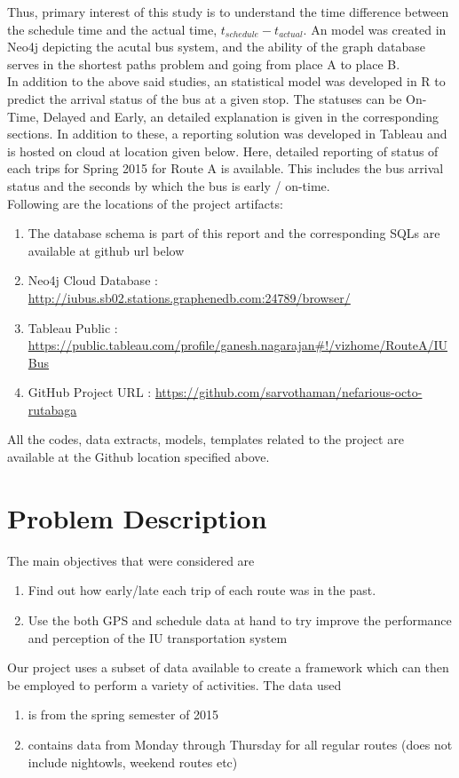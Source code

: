 \documentclass[12pt]{article}\usepackage[]{graphicx}\usepackage[]{color}
\begin{document}
Thus, primary interest of this study is to understand the time difference between the schedule time and the actual time, $t_{schedule} - t_{actual}$. An model was created in Neo4j depicting the acutal bus system, and the ability of the graph database serves in the shortest paths problem and going from place A to place B. \\

In addition to the above said studies, an statistical model was developed in R to predict the arrival status of the bus at a given stop. The statuses can be On-Time, Delayed and Early, an detailed explanation is given in the corresponding sections. In addition to these, a reporting solution was developed in Tableau and is hosted on cloud at location given below. Here, detailed reporting of status of each trips for Spring 2015 for Route A is available. This includes the bus arrival status and the seconds by which the bus is early / on-time. \\

Following are the locations of the project artifacts:
\begin{enumerate}
\item The database schema is part of this report and the corresponding SQLs are available at github url below
\item Neo4j Cloud Database : \url{http://iubus.sb02.stations.graphenedb.com:24789/browser/}
\item Tableau Public : \url{https://public.tableau.com/profile/ganesh.nagarajan#!/vizhome/RouteA/IUBus}
\item GitHub Project URL : \url{https://github.com/sarvothaman/nefarious-octo-rutabaga}
\end{enumerate}
All the codes, data extracts, models, templates related to the project are available at the Github location specified above.

\section{Problem Description}
The main objectives that were considered are
\begin{enumerate}
\item Find out how early/late each trip of each route was in the past. 
\item Use the both GPS and schedule data at hand to try improve the performance and perception of the IU transportation system
\end{enumerate}
Our project uses a subset of data available to create a framework which can then be employed to perform a variety of activities. The data used
\begin{enumerate}
\item is from the spring semester of 2015
\item contains data from Monday through Thursday for all regular routes (does not include nightowls, weekend routes etc)
\end{enumerate}
\end{document}
